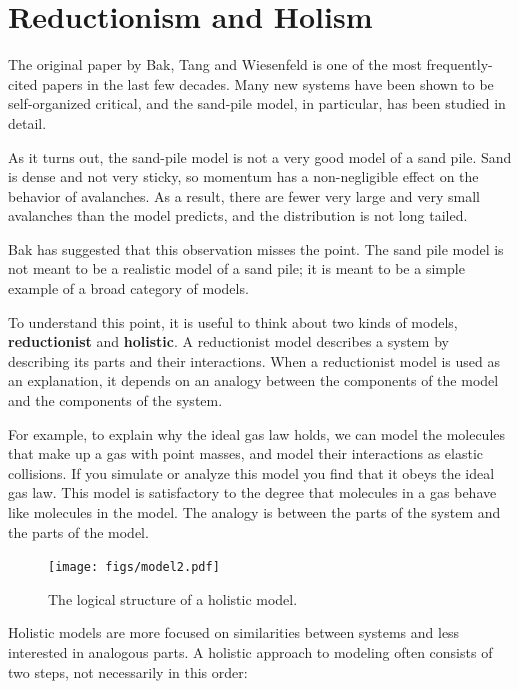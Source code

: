 \documentclass[10pt]{book}
\begin{document}
\section{Reductionism and Holism}
\label{model2}
 
The original paper by Bak, Tang and Wiesenfeld is one of
the most frequently-cited papers in the last few decades.
Many new systems have been shown to be self-organized critical,
and the sand-pile model, in particular, has been studied
in detail.

As it turns out, the sand-pile model is not a very good model
of a sand pile.  Sand is dense and not very sticky, so momentum
has a non-negligible effect on the behavior of avalanches.  As
a result, there are fewer very large and very small avalanches
than the model predicts, and the distribution is not long tailed.

Bak has suggested that this observation misses the point.
The sand pile model is not meant to be a realistic model of a sand
pile; it is meant to be a simple example of a broad category of
models.

To understand this point, it is useful to think about two
kinds of models, {\bf reductionist} and {\bf holistic}.  A
reductionist model describes a system by describing its parts
and their interactions.  When a reductionist model is used
as an explanation, it depends on an analogy between the
components of the model and the components of the system.

For example, to explain why the ideal gas law holds, we can model the
molecules that make up a gas with point masses, and model their
interactions as elastic collisions.  If you simulate or analyze this
model you find that it obeys the ideal gas law.  This model is
satisfactory to the degree that molecules in a gas behave like
molecules in the model.  The analogy is between the parts of the
system and the parts of the model.

\begin{figure}
\centerline{\texttt{[image: figs/model2.pdf]}}
\caption{The logical structure of a holistic model.\label{fig.model2}}
\end{figure}

Holistic models are more focused on similarities between systems and
less interested in analogous parts.  A holistic approach to modeling
often consists of two steps, not necessarily in this order:
\end{document}
